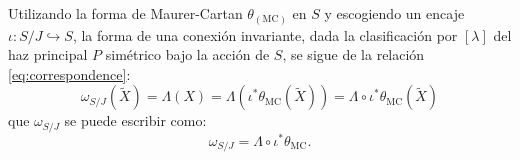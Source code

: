 Utilizando la forma de Maurer-Cartan $\theta_{(\mathrm{MC})}$ en $S$ y escogiendo un encaje $\iota: S/J \hookrightarrow S$, la forma de una conexi\'{o}n invariante, dada la clasificaci\'{o}n por $[\lambda]$ del haz principal $P$ sim\'{e}trico bajo la acci\'{o}n de $S$, se sigue de la relaci\'{o}n \eqref{eq:correspondence}:
%
\begin{equation*}
\omega_{S/J} (\tilde{X}) = \Lambda (X) = \Lambda (\iota^{*} \theta_{\mathrm{MC}} (\tilde{X})) = \Lambda \circ \iota^{*} \theta_{\mathrm{MC}} (\tilde{X})
\end{equation*}
%
que $\omega_{S/J}$ se puede escribir como:
%
\begin{equation}
\omega_{S/J} = \Lambda \circ \iota^{*} \theta_{\mathrm{MC}}.
\end{equation}